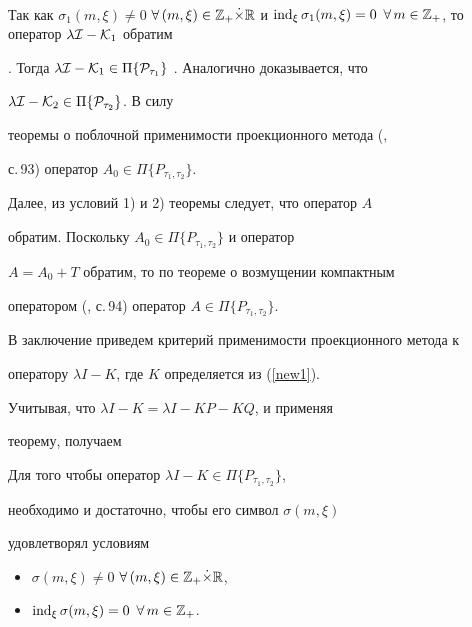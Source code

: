 \begin{pf}
\begin{gather*}
\end{gather*}


Так как $\sigma_1(m,\xi)\ne 0$ $\forall\, (m,\xi)\in{\Bbb


Z}_+\Dot\times {\Bbb R}$ и $\ind_\xi \sigma_1(m,\xi)=0$ $\forall\,


m\in{\Bbb Z}_+$, то оператор $\lambda{\cal I}-{\cal K}_1$ обратим


\cite{b4}. Тогда $\lambda{\cal I}-{\cal K}_1\in\Pi\{{\cal


P}_{\tau_1}\}$ \cite{b5}. Аналогично доказывается, что


$\lambda{\cal I}-{\cal K}_2\in\Pi\{{\cal P}_{\tau_2}\}$.  В силу


теоремы о поблочной применимости проекционного метода (\cite{b1},


с.\,93) оператор $A_0\in\Pi\{P_{\tau_1,\tau_2}\}$.





Далее, из условий 1) и 2) теоремы следует, что оператор $A$


обратим. Поскольку $A_0\in\Pi\{P_{\tau_1,\tau_2}\}$ и оператор


$A=A_0+T$ обратим, то по теореме о возмущении компактным


оператором (\cite{b1}, с.\,94) оператор $A\in


\Pi\{P_{\tau_1,\tau_2}\}$.


\end{pf}





В заключение приведем критерий применимости проекционного метода к


оператору $\lambda I-K$, где $K$ определяется из (\ref{new1}).


Учитывая, что $\lambda I-K=\lambda I-KP-KQ$, и применяя


теорему, получаем





\begin{cornonum}




Для того чтобы оператор $\lambda I-K\in\Pi\{P_{\tau_1,\tau_2}\}$,


необходимо и достаточно, чтобы его символ $\sigma(m,\xi)$


удовлетворял условиям


\begin{itemize}


\item[1)] $\sigma(m,\xi)\ne 0$ $\forall\, (m,\xi)\in{\Bbb


Z}_+\Dot\times {\Bbb R}$,


\item[2)] $\ind_\xi \sigma(m,\xi)=0$ $\forall\, m\in{\Bbb


Z}_+$.


\end{itemize}


\end{cornonum}








